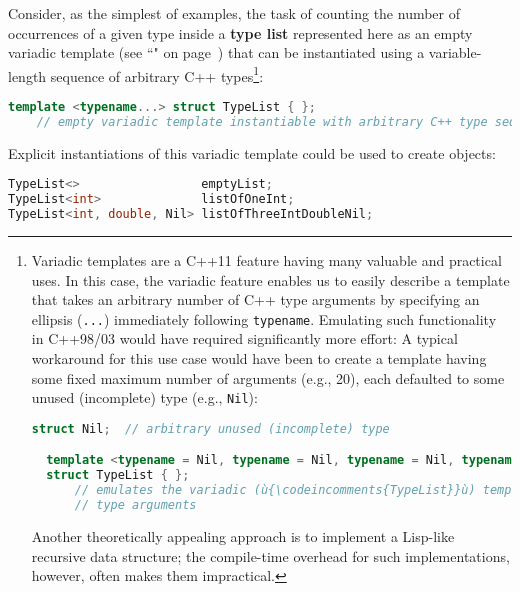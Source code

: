 Consider, as the simplest of examples, the task of counting the number
of occurrences of a given type inside a \textbf{type list} represented
here as an empty variadic template (see ``" on page~\pageref{variadictemplate}) that can be
instantiated using a variable-length sequence of arbitrary C++ types{\cprotect\footnote{Variadic templates are a C++11
  feature having many valuable and practical uses. In this case, the
  variadic feature enables us to easily describe a template that takes
  an arbitrary number of C++ type arguments by specifying an ellipsis
  (\texttt{...}) immediately following \texttt{typename}. Emulating such
  functionality in C++98/03 would have required significantly more
  effort: A typical workaround for this use case would have been to
  create a template having some fixed maximum number of arguments (e.g.,
  20), each defaulted to some unused (incomplete) type (e.g.,
  \texttt{Nil}):

  \begin{lstlisting}[language=C++, basicstyle={\ttfamily\footnotesize}]
  struct Nil;  // arbitrary unused (incomplete) type

  template <typename = Nil, typename = Nil, typename = Nil, typename = Nil>
  struct TypeList { };
      // emulates the variadic (ù{\codeincomments{TypeList}}ù) template (ù{\codeincomments{struct}}ù) for up to four
      // type arguments
  \end{lstlisting}

\vspace*{-1ex}      
\noindent Another theoretically appealing approach is to implement a Lisp-like
  recursive data structure; the compile-time overhead for such
  implementations, however, often makes them impractical.}}:

\begin{lstlisting}[language=C++]
template <typename...> struct TypeList { };
    // empty variadic template instantiable with arbitrary C++ type sequence
\end{lstlisting}
    
\noindent Explicit instantiations of this variadic template could be used to
create objects:

\begin{lstlisting}[language=C++]
TypeList<>                 emptyList;
TypeList<int>              listOfOneInt;
TypeList<int, double, Nil> listOfThreeIntDoubleNil;
\end{lstlisting}
    
